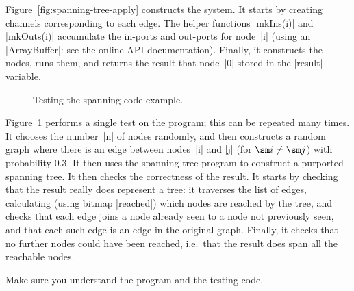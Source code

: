 
Figure~\ref{fig:spanning-tree-apply} constructs the system.  It starts by
creating channels corresponding to each edge.  The helper functions |mkIns(i)|
and |mkOuts(i)| accumulate the in-ports and out-ports for node~|i| (using an
|ArrayBuffer|: see the online API documentation).  Finally, it constructs the
nodes, runs them, and returns the result that node~|0| stored in the |result|
variable.


\begin{figure}
\caption{Testing the spanning code example.}
\label{fig:spanning-tree-test}
\end{figure}


Figure~\ref{fig:spanning-tree-test} performs a single test on the program;
this can be repeated many times.  It chooses the number~|n| of nodes randomly,
and then constructs a random graph where there is an edge between nodes~|i|
and |j| (for $\sm i \ne \sm j$) with probability $0.3$.  It then uses the
spanning tree program to construct a purported spanning tree.  It then checks
the correctness of the result.  It starts by checking that the result really
does represent a tree: it traverses the list of edges, calculating (using
bitmap |reached|) which nodes are reached by the tree, and checks that each
edge joins a node already seen to a node not previously seen, and that each
such edge is an edge in the original graph.  Finally, it checks that no
further nodes could have been reached, i.e.~that the result does span all the
reachable nodes.

\begin{instruction}
Make sure you understand the program and the testing code.
\end{instruction}

